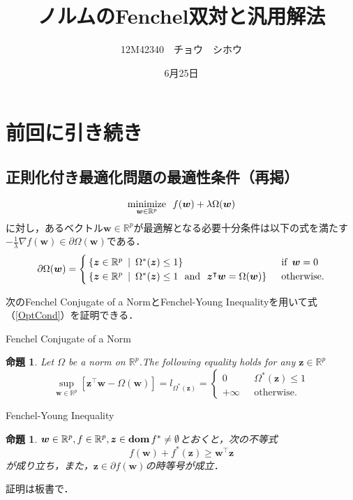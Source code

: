 \documentclass[a4paper,11pt]{jsarticle}
\title{ノルムのFenchel双対と汎用解法}
\author{12M42340　チョウ　シホウ}
\date{6月25日}
\newtheorem{prop}[theorem]{命題}
\numberwithin{theorem}{section}  %
\numberwithin{equation}{section} %
\newcommand{\dom}{\mathop{\mathrm{\bf dom}}\nolimits}
\newcommand{\minimize}{\mathop{\mathrm{\rm minimize}}\limits}
\begin{document}
{}
\renewcommand{\thepart}{\arabic{part}}

\section{前回に引き続き}
\subsection{正則化付き最適化問題の最適性条件（再掲）}
\begin{equation}
\minimize_{\bm{w} \in \mathbb{R}^p}\,\,\, f(\bm{w}) + \lambda \Omega(\bm{w}) \label{PP}
\end{equation}
に対し，あるベクトル$\bm{w} \in \mathbb{R}^p$が最適解となる必要十分条件は以下の式を満たす$-\frac{1}{\lambda} \nabla f(\bm{w}) \in \partial \Omega(\bm{w})$である．
\begin{equation}
\partial \Omega(\bm{w}) = \begin{cases}
\{ \bm{z} \in \mathbb{R}^p \,\,\,|\,\,\, \Omega^*(\bm{z}) \le 1 \} & \text{\,\,\,if\,\,\,} \bm{w} = 0 \\
\{ \bm{z} \in \mathbb{R}^p \,\,\,|\,\,\, \Omega^*(\bm{z}) \le 1 \text{\,\,\,\,and\,\,\,\,} \bm{z}^\intercal \bm{w} = \Omega(\bm{w}) \}  & \text{\,\,\,otherwise.}
\end{cases}
\label{OptCond}
\end{equation}

次のFenchel Conjugate of a NormとFenchel-Young Inequalityを用いて式（\ref{OptCond}）を証明できる．
\begin{itembox}[l]{Fenchel Conjugate of a Norm}
\begin{prop}
Let $\Omega$ be a norm on $\mathbb{R}^p$.The following equality holds for any $\bm{z} \in \mathbb{R}^p$
\begin{equation}
\sup_{\bm{w}\in \mathbb{R}^p}[\bm{z}^\intercal\bm{w} - \Omega(\bm{w})] = l_{\Omega^*(\bm{z})} = \begin{cases}
0 &\,\,\,\, \Omega^*(\bm{z}) \le 1 \\
+ \infty & \,\,\,\, \text{otherwise.}
\end{cases}
\end{equation}
\end{prop}
\end{itembox}
\begin{itembox}[l]{Fenchel-Young Inequality}
\begin{prop}
$\bm{w} \in \mathbb{R}^p,f \in \mathbb{R}^p,\bm{z} \in \dom f^* \neq \emptyset$とおくと，次の不等式
\[
f(\bm{w}) + f^*(\bm{z}) \ge \bm{w}^\intercal \bm{z}
\]が成り立ち，また，$\bm{z} \in \partial f(\bm{w})$の時等号が成立．
\end{prop}
\end{itembox}
証明は板書で．
\end{document}
